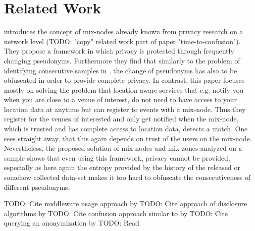 \chapter{Related Work}\label{chapter:related-work}

\parencite{location-privacy} introduces the concept of mix-nodes already known from privacy research on a network level (TODO: "copy" related work part of paper "time-to-confusion"). They propose a framework in which privacy is protected through frequently changing pseudonyms. Furthermore they find that similarly to the problem of identifying consecutive samples in \parencite{time-to-confusion}, the change of pseudonyms has also to be obfuscated in order to provide complete privacy. In contrast, this paper focuses mostly on solving the problem that location aware services that e.g. notify you when you are close to a venue of interest, do not need to have access to your location data at anytime but can register to events with a mix-node. Thus they register for the venues of interested and only get notified when the mix-node, which is trusted and has complete access to location data, detects a match. One sees straight away, that this again depends on trust of the users on the mix-node. Nevertheless, the proposed solution of mix-nodes and mix-zones analyzed on a sample shows that even using this framework, privacy cannot be provided, especially as here again the entropy provided by the history of the released or somehow collected data-set makes it too hard to obfuscate the consecutiveness of different pseudonyms.

TODO: Cite middleware usage approach by \parencite{gruteser2003anonymous}
TODO: Cite approach of disclosure algorithms by \parencite{gruteser2005anonymity}
TODO: Cite confusion approach similar to \parencite{time-to-confusion} by \parencite{hoh2005protecting}
TODO: Cite querying an anonymization by \parencite{mokbel2006new}
TODO: Read \parencite{tang2006putting}